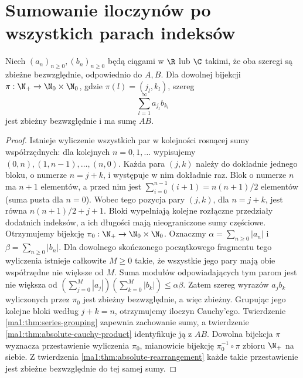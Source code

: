 \section{Sumowanie iloczynów po wszystkich parach indeksów}
\begin{twierdzenie}
\label{ma1:thm:pair-enumeration}
Niech $(a_n)_{n\ge0},(b_n)_{n\ge0}$ będą ciągami w $\R$ lub $\C$ takimi, że oba szeregi są zbieżne bezwzględnie, odpowiednio do $A,B$. Dla dowolnej bijekcji $\pi:\N_+\to\N_0\times\N_0$, gdzie $\pi(l)=(j_l,k_l)$, szereg
\[
 \sum_{l=1}^\infty a_{j_l}b_{k_l}
\]
jest zbieżny bezwzględnie i ma sumę $AB$.
\end{twierdzenie}
\begin{proof}
Istnieje wyliczenie wszystkich par w kolejności rosnącej sumy współrzędnych: dla kolejnych $n=0,1,\ldots$ wypisujemy $(0,n),(1,n-1),\ldots,(n,0)$. Każda para $(j,k)$ należy do dokładnie jednego bloku, o numerze $n=j+k$, i występuje w nim dokładnie raz. Blok o numerze $n$ ma $n+1$ elementów, a przed nim jest $\sum_{i=0}^{n-1}(i+1)=n(n+1)/2$ elementów (suma pusta dla $n=0$). Wobec tego pozycja pary $(j,k)$, dla $n=j+k$, jest równa $n(n+1)/2+j+1$. Bloki wypełniają kolejne rozłączne przedziały dodatnich indeksów, a ich długości mają nieograniczone sumy częściowe. Otrzymujemy bijekcję $\pi_0:\N_+\to\N_0\times\N_0$.
Oznaczmy $\alpha=\sum_{n\ge0}|a_n|$ i $\beta=\sum_{n\ge0}|b_n|$. Dla dowolnego skończonego początkowego fragmentu tego wyliczenia istnieje całkowite $M\ge0$ takie, że wszystkie jego pary mają obie współrzędne nie większe od $M$. Suma modułów odpowiadających tym parom jest nie większa od
$(\sum_{j=0}^M|a_j|)(\sum_{k=0}^M|b_k|)\le\alpha\beta$. Zatem szereg wyrazów $a_jb_k$ wyliczonych przez $\pi_0$ jest zbieżny bezwzględnie, a więc zbieżny.
Grupując jego kolejne bloki według $j+k=n$, otrzymujemy iloczyn Cauchy'ego. Twierdzenie \ref{ma1:thm:series-grouping} zapewnia zachowanie sumy, a twierdzenie \ref{ma1:thm:absolute-cauchy-product} identyfikuje ją z $AB$. Dowolna bijekcja $\pi$ wyznacza przestawienie wyliczenia $\pi_0$, mianowicie bijekcję $\pi_0^{-1}\circ\pi$ zbioru $\N_+$ na siebie. Z twierdzenia \ref{ma1:thm:absolute-rearrangement} każde takie przestawienie jest zbieżne bezwzględnie do tej samej sumy.
\end{proof}

